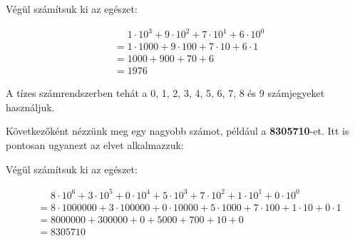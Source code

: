 \documentclass{article}
\begin{document}
Végül számítsuk ki az egészet:

\begin{center}
\begin{align*}
  &\phantom{= } 1 \cdot 10^3 + 9 \cdot 10^2 + 7 \cdot 10^1 + 6 \cdot 10^0 \\
  &= 1 \cdot 1000 + 9 \cdot 100 + 7 \cdot 10 + 6 \cdot 1 \\
  &= 1000 + 900 + 70 + 6 \\
  &= 1976
\end{align*}
\end{center}
A tízes számrendszerben tehát a 0, 1, 2, 3, 4, 5, 6, 7, 8 és 9 számjegyeket használjuk.
\newpage

Következőként nézzünk meg egy nagyobb számot, például a \textbf{8305710}-et. Itt is pontosan ugyanezt az elvet alkalmazzuk:

\begin{center}
\end{center}

Végül számítsuk ki az egészet:

\begin{center}
\begin{align*}
  &\phantom{= } 8 \cdot 10^6 + 3 \cdot 10^5 + 0 \cdot 10^4 + 5 \cdot 10^3 + 7 \cdot 10^2 + 1 \cdot 10^1 + 0 \cdot 10^0 \\
  &= 8 \cdot 1000000 + 3 \cdot 100000 + 0 \cdot 10000 + 5 \cdot 1000 + 7 \cdot 100 + 1 \cdot 10 + 0 \cdot 1 \\
  &= 8000000 + 300000 + 0 + 5000 + 700 + 10 + 0 \\
  &= 8305710
\end{align*}
\end{center}
\end{document}
